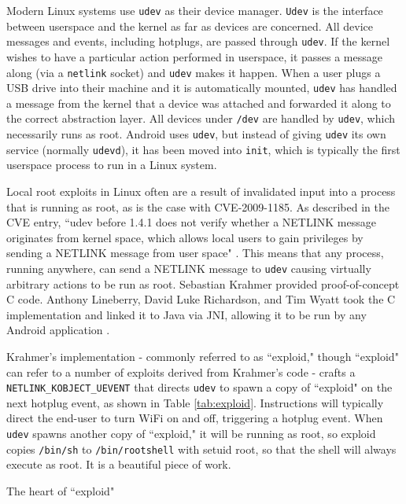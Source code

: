 Modern Linux systems use \texttt{udev} as their device manager.  \texttt{Udev} is the interface between userspace and the kernel as
far as devices are concerned.  All device messages and events, including hotplugs, are passed through \texttt{udev}.  If the kernel
wishes to have a particular action performed in userspace, it passes a message along (via a \texttt{netlink} socket) and
\texttt{udev} makes it happen.  When a user plugs a USB drive into their machine and it is automatically mounted, \texttt{udev} has
handled a message from the kernel that a device was attached and forwarded it along to the correct abstraction layer.  All devices
under \texttt{/dev} are handled by \texttt{udev}, which necessarily runs as root.  Android uses \texttt{udev}, but instead
of giving \texttt{udev} its own service (normally \texttt{udevd}), it has been moved into \texttt{init}, which is typically the
first userspace process to run in a Linux system.

Local root exploits in Linux often are a result of invalidated input into a process that is running as root, as is the case with
CVE-2009-1185.  As described in the CVE entry, ``udev before 1.4.1 does not verify whether a NETLINK message originates from kernel
space, which allows local users to gain privileges by sending a NETLINK message from user space" \cite{udevcve}.  This means that
any process, running anywhere, can send a NETLINK message to \texttt{udev} causing virtually arbitrary actions to be run as root.
Sebastian Krahmer provided proof-of-concept C code.  Anthony Lineberry, David Luke Richardson, and Tim Wyatt took the C
implementation and linked it to Java via JNI, allowing it to be run by any Android application \cite{arentpermissions}.

Krahmer's implementation - commonly referred to as ``exploid," though ``exploid" can refer to a number of exploits derived from
Krahmer's code - crafts a \texttt{NETLINK\_KOBJECT\_UEVENT} that directs \texttt{udev} to spawn a copy of ``exploid" on the next
hotplug event, as shown in Table \ref{tab:exploid}.  Instructions will typically direct the end-user to turn WiFi on and off,
triggering a hotplug event.  When \texttt{udev} spawns another copy of ``exploid," it will be running as root, so exploid copies
\texttt{/bin/sh} to \texttt{/bin/rootshell} with setuid root, so that the shell will always execute as root.  It is a beautiful
piece of work.

\begin{table}[htb]

\caption{The heart of ``exploid"}
\label{tab:exploid}
\end{table}

